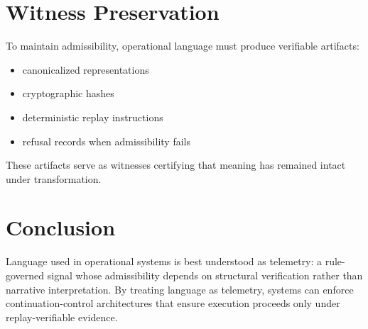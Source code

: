 \documentclass[11pt]{article}
\begin{document}
\section{Witness Preservation}

To maintain admissibility, operational language must produce verifiable artifacts:

\begin{itemize}
\item canonicalized representations
\item cryptographic hashes
\item deterministic replay instructions
\item refusal records when admissibility fails
\end{itemize}

These artifacts serve as witnesses certifying that meaning has remained intact under transformation.

\section{Conclusion}

Language used in operational systems is best understood as telemetry: a rule-governed signal whose admissibility 
depends on structural verification rather than narrative interpretation. 
By treating language as telemetry, systems can enforce continuation-control architectures that ensure execution proceeds 
only under replay-verifiable evidence.



\end{document}
